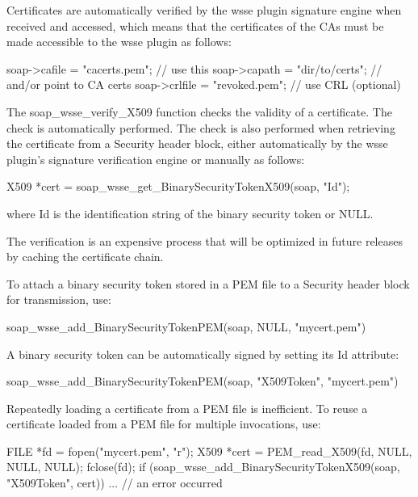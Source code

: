 Certificates are automatically verified by the wsse plugin signature engine when received and accessed, which means that the certificates of the CAs must be made accessible to the wsse plugin as follows:


\begin{DoxyCode}
    soap->cafile = "cacerts.pem";  // use this
    soap->capath = "dir/to/certs"; // and/or point to CA certs
    soap->crlfile = "revoked.pem"; // use CRL (optional)
\end{DoxyCode}


The soap\_\-wsse\_\-verify\_\-X509 function checks the validity of a certificate. The check is automatically performed. The check is also performed when retrieving the certificate from a Security header block, either automatically by the wsse plugin's signature verification engine or manually as follows:


\begin{DoxyCode}
    X509 *cert = soap_wsse_get_BinarySecurityTokenX509(soap, "Id");
\end{DoxyCode}


where Id is the identification string of the binary security token or NULL.

The verification is an expensive process that will be optimized in future releases by caching the certificate chain.

To attach a binary security token stored in a PEM file to a Security header block for transmission, use:


\begin{DoxyCode}
    soap_wsse_add_BinarySecurityTokenPEM(soap, NULL, "mycert.pem")
\end{DoxyCode}


A binary security token can be automatically signed by setting its Id attribute:


\begin{DoxyCode}
    soap_wsse_add_BinarySecurityTokenPEM(soap, "X509Token", "mycert.pem")
\end{DoxyCode}


Repeatedly loading a certificate from a PEM file is inefficient. To reuse a certificate loaded from a PEM file for multiple invocations, use:


\begin{DoxyCode}
    FILE *fd = fopen("mycert.pem", "r");
    X509 *cert = PEM_read_X509(fd, NULL, NULL, NULL);
    fclose(fd);
    if (soap_wsse_add_BinarySecurityTokenX509(soap, "X509Token", cert))
      ... // an error occurred
\end{DoxyCode}


